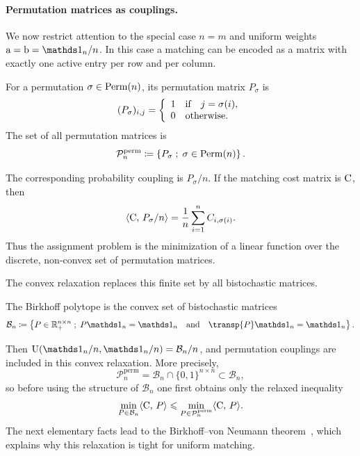 \paragraph{Permutation matrices as couplings.}

We now restrict attention to the special case $n=m$ and uniform weights $\a=\b=\ones_n/n$. In this case a matching can be encoded as a matrix with exactly one active entry per row and per column.

\begin{defn}\label{def-permutation-matrices}
	For a permutation $\sigma\in\mathrm{Perm}(n)$, its permutation matrix $P_\sigma$ is
	\[
		(P_\sigma)_{i,j}=\left\{ \begin{array}{l} 1 \quad \text{if} \quad j=\sigma(i),\\ 0 \quad\text{otherwise}. \end{array} \right.
	\]
	The set of all permutation matrices is
	\[
		\mathcal P_n^{\mathrm{perm}}
		\coloneqq
		\left\{ P_\sigma \;;\; \sigma\in\mathrm{Perm}(n) \right\} .
	\]
\end{defn}
The corresponding probability coupling is $P_\sigma/n$. If the matching cost matrix is $\mathrm{C}$, then
\[
	\langle \mathrm{C},\,P_\sigma/n\rangle=\frac1n\sum_{i=1}^n C_{i,\sigma(i)}.
\]
Thus the assignment problem is the minimization of a linear function over the discrete, non-convex set of permutation matrices.

The convex relaxation replaces this finite set by all bistochastic matrices.

\begin{defn}\label{def-birkhoff-polytope}
	The Birkhoff polytope is the convex set of bistochastic matrices
	\[
		\mathcal B_n
		\eqdef
		\enscond{P\in\RR_+^{n\times n}}{P\ones_n=\ones_n \qandq \transp{P}\ones_n=\ones_n}.
	\]
\end{defn}
Then $\CouplingsD(\ones_n/n,\ones_n/n)=\mathcal B_n/n$, and permutation couplings are included in this convex relaxation. More precisely,
\[
	\mathcal P_n^{\mathrm{perm}}
	=
	\mathcal B_n\cap\{0,1\}^{n\times n}
	\subset
	\mathcal B_n,
\]
so before using the structure of $\mathcal B_n$ one first obtains only the relaxed inequality
\[
	\min_{P\in\mathcal B_n}\langle \mathrm{C},\,P\rangle
	\leqslant
	\min_{P\in\mathcal P_n^{\mathrm{perm}}}\langle \mathrm{C},\,P\rangle.
\]
The next elementary facts lead to the Birkhoff--von Neumann theorem~\cite{birkhoff,vonNeumann1953assignment}, which explains why this relaxation is tight for uniform matching.


